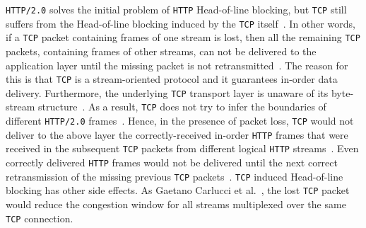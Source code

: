 \documentclass[12pt,a4paper,twoside,openright]{report}
\begin{document}
    
    
    
    


\texttt{HTTP/2.0} solves the initial problem of \texttt{HTTP} Head-of-line blocking, but \texttt{TCP} still suffers from the Head-of-line blocking induced by the \texttt{TCP} itself~\cite{bib_making_web_faster_with_http2, bib_TCP_Head_of_line_blocking_stackoverflow, How-does-HTTP-2-solve-the-Head-of-Line-blocking-HOL-issue, head-of-line-blocking-in-quic-and-http-3-the-details}.
In other words, if a \texttt{TCP} packet containing frames of one stream is lost, then all the remaining \texttt{TCP} packets, containing frames of other streams, can not be delivered to the application layer until the missing packet is not retransmitted~\cite{bib_making_web_faster_with_http2, bib_TCP_Head_of_line_blocking_stackoverflow, How-does-HTTP-2-solve-the-Head-of-Line-blocking-HOL-issue}.
The reason for this is that \texttt{TCP} is a stream-oriented protocol and it guarantees in-order data delivery.
Furthermore, the underlying \texttt{TCP} transport layer is unaware of its byte-stream structure~\cite{head-of-line-blocking-in-quic-and-http-3-the-details}.
As a result, \texttt{TCP} does not try to infer the boundaries of different \texttt{HTTP/2.0} frames~\cite{head-of-line-blocking-in-quic-and-http-3-the-details}.
Hence, in the presence of packet loss, \texttt{TCP} would not deliver to the above layer the correctly-received in-order \texttt{HTTP} frames that were received in the subsequent \texttt{TCP} packets from different logical \texttt{HTTP} streams~\cite{head-of-line-blocking-in-quic-and-http-3-the-details}.
Even correctly delivered \texttt{HTTP} frames would not be delivered until the next correct retransmission of the missing previous \texttt{TCP} packets~\cite{head-of-line-blocking-in-quic-and-http-3-the-details}.
\texttt{TCP} induced Head-of-line blocking has other side effects.
As Gaetano Carlucci et al.~\cite{HTTP_over_UDP_An_Experimental_Investigation_of_QUIC}, the lost \texttt{TCP} packet would reduce the congestion window for all streams multiplexed over the same \texttt{TCP} connection.



\end{document}
